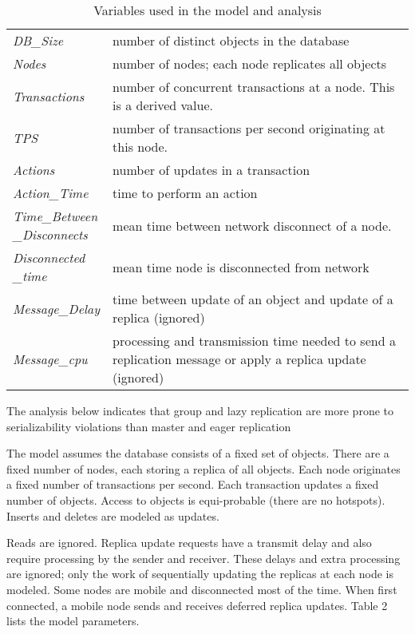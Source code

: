 \documentclass[a4paper,11pt,twoside,openright]{article}
\begin{document}
\begin{table}
  \begin{tabu} to \columnwidth {X[1,c]X[3,L]}
  \toprule
  \emph{DB\_Size} & number of distinct objects in the database\\
  \emph{Nodes} & number of nodes; each node replicates all objects\\
  \emph{Transactions} & number of concurrent transactions at a node. This
  is a derived value.\\
  \emph{TPS} & number of transactions per second originating at this
  node.\\
  \emph{Actions} & number of updates in a transaction\\
  \emph{Action\_Time} & time to perform an action\\
  \emph{Time\_Between\newline
  \_Disconnects} & mean time between network disconnect of a node.\\
  \emph{Disconnected\newline
  \_time} & mean time node is disconnected from network\\
  \emph{Message\_Delay} & time between update of an object and update of a
  replica (ignored)\\
  \emph{Message\_cpu} & processing and transmission time needed to send a
  replication message or apply a replica update (ignored)\\
  \bottomrule
  \end{tabu}
  \caption{Variables used in the model and analysis}
\end{table}

The analysis below indicates that group and lazy replication are more
prone to serializability violations than master and eager replication

The model assumes the database consists of a fixed set of objects. There
are a fixed number of nodes, each storing a replica of all objects. Each
node originates a fixed number of transactions per second. Each
transaction updates a fixed number of objects. Access to objects is
equi-probable (there are no hotspots). Inserts and deletes are modeled
as updates.

Reads are ignored. Replica update requests have a transmit delay and
also require processing by the sender and receiver. These delays and
extra processing are ignored; only the work of sequentially updating the
replicas at each node is modeled. Some nodes are mobile and disconnected
most of the time. When first connected, a mobile node sends and receives
deferred replica updates. Table 2 lists the model parameters.
\end{document}
